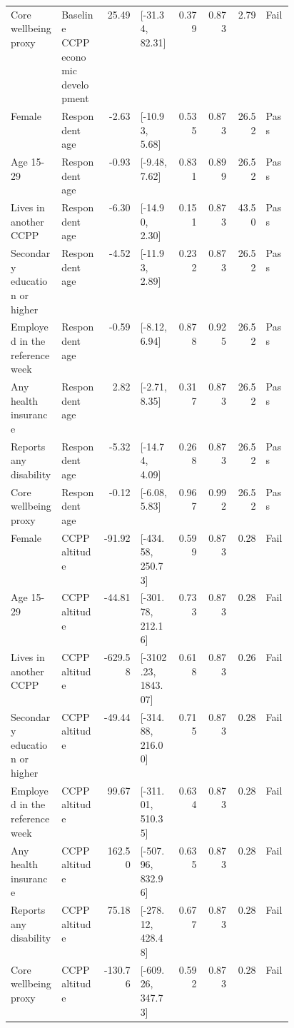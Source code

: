 \begin{longtable}{@{}p{0.18\linewidth}p{0.15\linewidth}rp{0.13\linewidth}rrrl@{}}
Core wellbeing proxy & Baseline CCPP economic development & 25.49 & [-31.34, 82.31] & 0.379 & 0.873 & 2.79 & Fail \\
Female & Respondent age & -2.63 & [-10.93, 5.68] & 0.535 & 0.873 & 26.52 & Pass \\
Age 15-29 & Respondent age & -0.93 & [-9.48, 7.62] & 0.831 & 0.899 & 26.52 & Pass \\
Lives in another CCPP & Respondent age & -6.30 & [-14.90, 2.30] & 0.151 & 0.873 & 43.50 & Pass \\
Secondary education or higher & Respondent age & -4.52 & [-11.93, 2.89] & 0.232 & 0.873 & 26.52 & Pass \\
Employed in the reference week & Respondent age & -0.59 & [-8.12, 6.94] & 0.878 & 0.925 & 26.52 & Pass \\
Any health insurance & Respondent age & 2.82 & [-2.71, 8.35] & 0.317 & 0.873 & 26.52 & Pass \\
Reports any disability & Respondent age & -5.32 & [-14.74, 4.09] & 0.268 & 0.873 & 26.52 & Pass \\
Core wellbeing proxy & Respondent age & -0.12 & [-6.08, 5.83] & 0.967 & 0.992 & 26.52 & Pass \\
Female & CCPP altitude & -91.92 & [-434.58, 250.73] & 0.599 & 0.873 & 0.28 & Fail \\
Age 15-29 & CCPP altitude & -44.81 & [-301.78, 212.16] & 0.733 & 0.873 & 0.28 & Fail \\
Lives in another CCPP & CCPP altitude & -629.58 & [-3102.23, 1843.07] & 0.618 & 0.873 & 0.26 & Fail \\
Secondary education or higher & CCPP altitude & -49.44 & [-314.88, 216.00] & 0.715 & 0.873 & 0.28 & Fail \\
Employed in the reference week & CCPP altitude & 99.67 & [-311.01, 510.35] & 0.634 & 0.873 & 0.28 & Fail \\
Any health insurance & CCPP altitude & 162.50 & [-507.96, 832.96] & 0.635 & 0.873 & 0.28 & Fail \\
Reports any disability & CCPP altitude & 75.18 & [-278.12, 428.48] & 0.677 & 0.873 & 0.28 & Fail \\
Core wellbeing proxy & CCPP altitude & -130.76 & [-609.26, 347.73] & 0.592 & 0.873 & 0.28 & Fail \\
\end{longtable}
\endgroup
